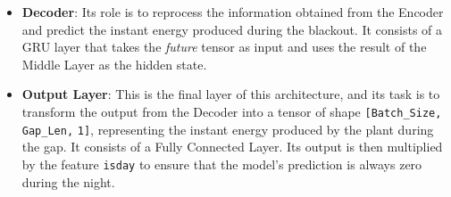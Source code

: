 \begin{itemize}
	\item \textbf{Decoder}: Its role is to reprocess the information obtained from the Encoder and predict the instant energy produced during the blackout. It consists of a GRU layer that takes the \textit{future} tensor as input and uses the result of the Middle Layer as the hidden state.

	\item \textbf{Output Layer}: This is the final layer of this architecture, and its task is to transform the output from the Decoder into a tensor of shape \verb|[Batch_Size,| \verb|Gap_Len,| \verb|1]|, representing the instant energy produced by the plant during the gap. It consists of a Fully Connected Layer. Its output is then multiplied by the feature \verb|isday| to ensure that the model's prediction is always zero during the night.
\end{itemize}

